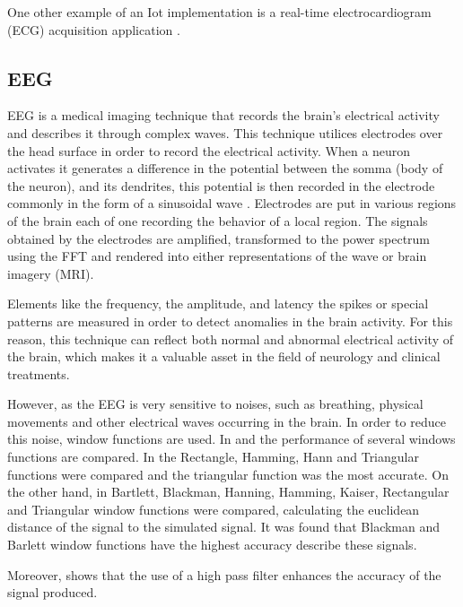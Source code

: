   
   One other example of an Iot implementation is a real-time electrocardiogram (ECG) acquisition application \cite{ecgIot}.


\subsection{EEG}

EEG is a medical imaging technique that records the brain’s electrical activity and describes it through complex waves.  This technique utilices electrodes over the head surface in order to record the electrical activity. When a neuron activates it generates a difference in the potential between the somma (body of the neuron), and its dendrites, this potential is then recorded in the electrode commonly in the form of a sinusoidal wave \cite{EEGfundamentals}. Electrodes are put in various regions of the brain each of one recording the behavior of a local region. The signals obtained by the electrodes are amplified, transformed to the power spectrum using the FFT and rendered into either representations of the wave or brain imagery (MRI).

Elements like the frequency, the amplitude, and latency the spikes or special patterns  are measured  in order to detect anomalies in the brain activity. For this reason, this technique can reflect both normal and abnormal electrical activity of the brain, which makes it a valuable asset in the field of neurology and clinical treatments. 

However, as the EEG is very sensitive to noises, such as breathing, physical movements and other electrical waves occurring in the brain. In order to reduce this noise, window functions are used. In \cite{EEGwindowfunc1} and \cite{EEGwindowfunc3} the performance of several windows functions are compared. In \cite{EEGwindowfunc1} the Rectangle, Hamming, Hann and Triangular functions were compared and the triangular function was the most accurate. On the other hand, in \cite{EEGwindowfunc2} Bartlett, Blackman, Hanning, Hamming, Kaiser, Rectangular and Triangular window functions were compared, calculating the euclidean distance of the signal to the simulated signal. It was found that Blackman and Barlett window functions have the highest accuracy describe these signals.

Moreover, \cite{EEGwindowfunc1} shows that the use of a high pass filter enhances the accuracy of the signal produced.

